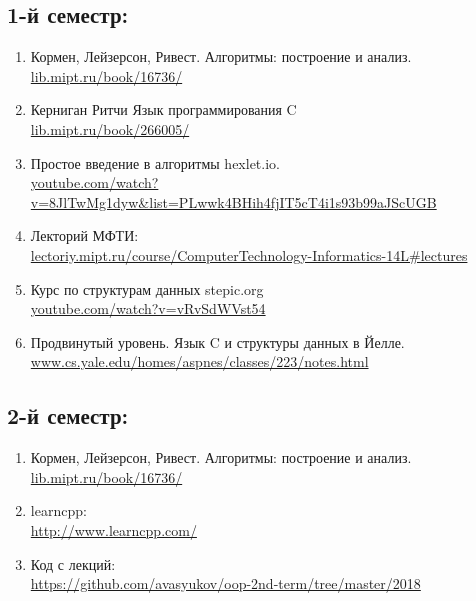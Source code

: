 \documentclass{article}
\begin{document}
\subsection*{1-й семестр:}
\begin{enumerate}
\item Кормен, Лейзерсон, Ривест. Алгоритмы: построение и анализ.\\ 
\hspace*{16pt} \href{https://lib.mipt.ru/book/16736/}{lib.mipt.ru/book/16736/}
\item Керниган Ритчи Язык программирования C \\
\hspace*{16pt} \href{https://lib.mipt.ru/book/266005/}{lib.mipt.ru/book/266005/}
\item Простое введение в алгоритмы hexlet.io. \\ \hspace*{16pt} \href{https://www.youtube.com/watch?v=8JlTwMg1dyw&list=PLwwk4BHih4fjIT5cT4i1s93b99aJScUGB}{youtube.com/watch?v=8JlTwMg1dyw\&list=PLwwk4BHih4fjIT5cT4i1s93b99aJScUGB}
\item Лекторий МФТИ: \\ \hspace*{16pt} 
\href{http://lectoriy.mipt.ru/course/ComputerTechnology-Informatics-14L#lectures}
{lectoriy.mipt.ru/course/ComputerTechnology-Informatics-14L\#lectures}
\item Курс по структурам данных stepic.org  \\
\hspace*{16pt} \href{https://www.youtube.com/watch?v=vRvSdWVst54}{youtube.com/watch?v=vRvSdWVst54}
\item Продвинутый уровень. Язык C и структуры данных в Йелле.\\ \hspace*{16pt} \href{http://www.cs.yale.edu/homes/aspnes/classes/223/notes.html}{www.cs.yale.edu/homes/aspnes/classes/223/notes.html}
\end{enumerate}

\subsection*{2-й семестр:}
\begin{enumerate}
\item Кормен, Лейзерсон, Ривест. Алгоритмы: построение и анализ.\\ 
\hspace*{16pt} \href{https://lib.mipt.ru/book/16736/}{lib.mipt.ru/book/16736/}
\item learncpp:\\ 
\hspace*{16pt} \href{http://www.learncpp.com/}{http://www.learncpp.com/}
\item Код с лекций:\\ 
\hspace*{16pt} \href{https://github.com/avasyukov/oop-2nd-term/tree/master/2018}{https://github.com/avasyukov/oop-2nd-term/tree/master/2018}

\end{enumerate}
\end{document}
